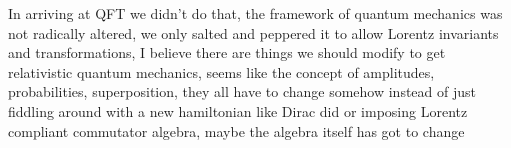 \documentclass[aps,preprint,preprintnumbers,nofootinbib,showpacs,prd]{revtex4-1}
\begin{document}
In arriving at QFT we didn't do that, the framework of quantum mechanics was not radically altered, we only salted and peppered it to allow Lorentz invariants and transformations, I believe there are things we should modify to get relativistic quantum mechanics, seems like the concept of amplitudes, probabilities, superposition, they all have to change somehow instead of just fiddling around with a new hamiltonian like Dirac did or imposing Lorentz compliant commutator algebra, maybe the algebra itself has got to change
\end{document}
